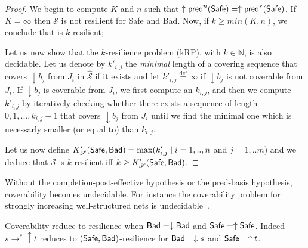 	\begin{proof}

We begin to compute $K$ and $n$ such that $ \uparrow \textsf{pred}^n(\textsf{Safe})=  \uparrow \textsf{pred}^*(\textsf{Safe})$.
If $K=\infty$ then $\mathscr{S}$ is not resilient for Safe and Bad.
Now, if $k \geq min(K,n)$, we conclude that is $k$-resilient; 
\fi

Let us now show that the $k$-resilience problem (kRP), with $k \in \mathbb{N}$, is also decidable.
Let us denote by $k'_{i,j}$ the \emph{minimal} length of a covering sequence that covers $\downarrow b_j$ from $J_i$ in $\hat{\mathscr{S}}$ if it exists and let $k'_{i,j}\stackrel{\text{def}}{=}\infty$ if $\downarrow b_j$ is not coverable from $J_i$. 
If $\downarrow b_j$ is coverable from $J_i$, we first compute an $k_{i,j}$, and then we compute $k'_{i,j}$ by iteratively checking whether there exists a sequence of length $0,1,...,k_{i,j}-1$ that covers $\downarrow b_j$ from $J_i$ until we find the minimal one which is necessarly smaller (or equal to) than $k_{i,j}$.

Let us now define $K'_{\mathscr{S}}(\textsf{Safe},\textsf{Bad})=\max(k'_{i,j} \mid i=1,..,n$ and $j= 1,..m$) and we deduce that  $\mathscr{S}$ is $k$-resilient iff $k \geq K'_{\mathscr{S}}(\textsf{Safe},\textsf{Bad})$.

\end{proof}

%


Without the completion-post-effective hypothesis or the pred-basis hypothesis, coverability 
becomes undecidable. For instance the coverability problem for strongly increasing well-structured nets is undecidable~\cite{FMP-ic04}. 

Coverability reduce
to resilience when $\textsf{Bad} = \downarrow \textsf{Bad}$ and  $\textsf{Safe} = \uparrow \textsf{Safe}$.
Indeed $s \to^* \uparrow t$ 
reduces to $(\textsf{Safe},\textsf{Bad})$-resilience for $\textsf{Bad} = \downarrow s$ and $\textsf{Safe} = \uparrow t$.





